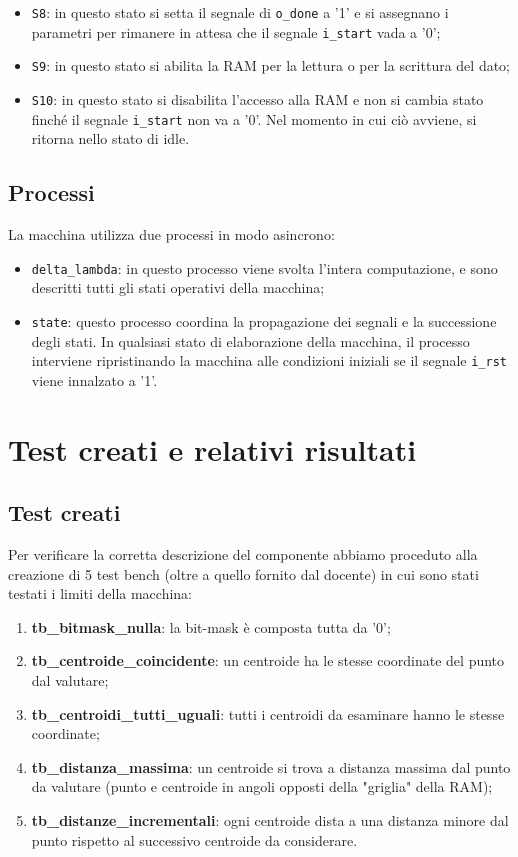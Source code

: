 \documentclass[a4paper,12pt]{article}
\begin{document}
\begin{itemize}
\item \texttt{S8}: in questo stato si setta il segnale di \texttt{o\_done} a '1' e si assegnano i parametri per rimanere in attesa che il segnale \texttt{i\_start} vada a '0';
\item \texttt{S9}: in questo stato si abilita la RAM per la lettura o per la scrittura del dato;
\item \texttt{S10}: in questo stato si disabilita l'accesso alla RAM e non si cambia stato finché il segnale \texttt{i\_start} non va a '0'. Nel momento in cui ciò avviene, si ritorna nello stato di idle.
\end{itemize}

\subsection{Processi}
La macchina utilizza due processi in modo asincrono:
\begin{itemize}
\item \texttt{delta\_lambda}: in questo processo viene svolta l'intera computazione, e sono descritti tutti gli stati operativi della macchina;
\item \texttt{state}: questo processo coordina la propagazione dei segnali e la successione degli stati. In qualsiasi stato di elaborazione della macchina, il processo interviene ripristinando la macchina alle condizioni iniziali se il segnale \texttt{i\_rst} viene innalzato a '1'.
\end{itemize}

\section{Test creati e relativi risultati}

\subsection{Test creati}
Per verificare la corretta descrizione del componente abbiamo proceduto alla creazione di 5 test bench (oltre a quello fornito dal docente) in cui sono stati testati i limiti della macchina:

\begin{enumerate}
\item \textbf{tb\_bitmask\_nulla}: la bit-mask è composta tutta da '0';
\item \textbf{tb\_centroide\_coincidente}: un centroide ha le stesse coordinate del punto dal valutare;
\item \textbf{tb\_centroidi\_tutti\_uguali}: tutti i centroidi da esaminare hanno le stesse coordinate;
\item \textbf{tb\_distanza\_massima}: un centroide si trova a distanza massima dal punto da valutare (punto e centroide in angoli opposti della "griglia" della RAM);
\item \textbf{tb\_distanze\_incrementali}: ogni centroide dista a una distanza minore dal punto rispetto al successivo centroide da considerare.
\end{enumerate}
\end{document}
